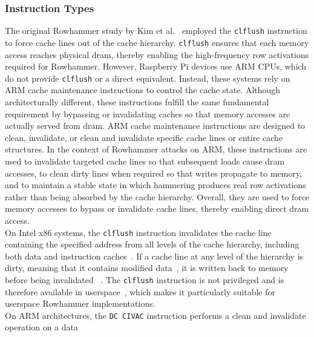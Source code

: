     \subsubsection{Instruction Types} \label{subsubsec:instruction-types}
        The original Rowhammer study by Kim et al.~\cite{paperFlippingBits} employed the \texttt{clflush} instruction to force cache lines 
        out of the cache hierarchy. \texttt{clflush} ensures that each memory access reaches physical \gls{dram}, thereby 
        enabling the high-frequency row activations required for Rowhammer. However, Raspberry Pi devices 
        use ARM CPUs, which do not provide \texttt{clflush} or a direct equivalent. Instead, these systems rely on 
        ARM cache maintenance instructions to control the cache state. Although architecturally different, 
        these instructions fulfill the same fundamental requirement by bypassing or invalidating caches so 
        that memory accesses are actually served from \gls{dram}. ARM cache maintenance instructions are designed 
        to clean, invalidate, or clean and invalidate specific cache lines or entire cache structures. In 
        the context of Rowhammer attacks on ARM, these instructions are used to invalidate targeted cache 
        lines so that subsequent loads cause \gls{dram} accesses, to clean dirty lines when required so that writes 
        propagate to memory, and to maintain a stable state in which hammering produces real row activations 
        rather than being absorbed by the cache hierarchy. Overall, they are used to force memory accesses 
        to bypass or invalidate cache lines, thereby enabling direct \gls{dram} access.
        \\
        On Intel x86 systems, the \texttt{clflush} instruction invalidates the cache line containing the specified 
        address from all levels of the cache hierarchy, including both data and instruction caches~\cite{thesisCacheAttacksandRH}. 
        If a cache line at any level of the hierarchy is dirty, meaning 
        that it contains modified data~\cite{docCLFLUSH}, it is written back to memory before being invalidated ~\cite{datasheetIntelReferenceManual, thesisCacheAttacksandRH}.
        The \texttt{clflush} instruction is not privileged and is therefore 
        available in userspace~\cite{datasheetIntelReferenceManual, thesisCacheAttacksandRH}, which makes it particularly suitable 
        for userspace Rowhammer implementations.
        \\
        On ARM architectures, the \texttt{DC CIVAC} instruction performs a clean and invalidate operation on a data 
